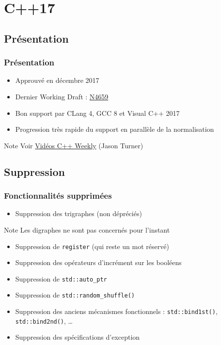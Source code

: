 \documentclass[C++.tex]{subfiles}
\begin{document}
\section{C++17}
\subsection*{Présentation}
\begin{frame}
	\frametitle{Présentation}
	\begin{itemize}
		\item Approuvé en décembre 2017
		\item Dernier Working Draft : \href{http://www.open-std.org/jtc1/sc22/wg21/docs/papers/2017/n4659.pdf}{N4659}
		\item Bon support par CLang 4, GCC 8 et Visual C++ 2017
		\item Progression très rapide du support en parallèle de la normalisation
	\end{itemize}

	\begin{block}{Note}
		Voir \href{https://www.youtube.com/user/lefticus1/videos}{Vidéos C++ Weekly} (Jason Turner)
	\end{block}
\end{frame}

\subsection*{Suppression}
\begin{frame}[fragile]
	\frametitle{Fonctionnalités supprimées}
	\begin{itemize}
		\item Suppression des trigraphes (non dépréciés)
	\end{itemize}

	\begin{block}{Note}
		Les digraphes ne sont pas concernés pour l'instant
	\end{block}

	\begin{itemize}
		\item Suppression de \lstinline|register| (qui reste un mot réservé)
		\item Suppression des opérateurs d'incrément sur les booléens


		\item Suppression de \lstinline|std::auto_ptr|
		\item Suppression de \lstinline|std::random_shuffle()|
		\item Suppression des anciens mécanismes fonctionnels : \lstinline|std::bind1st()|, \lstinline|std::bind2nd()|, \ldots
		\item Suppression des spécifications d'exception
	\end{itemize}
		
\end{frame}
\end{document}
